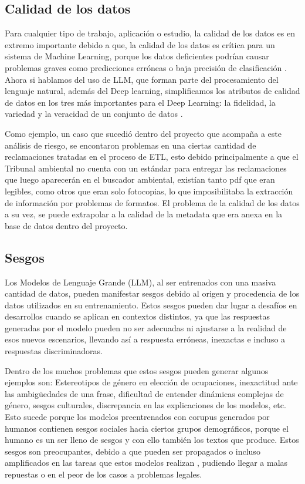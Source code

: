 \newpage

\subsection{Calidad de los datos}

Para cualquier tipo de trabajo, aplicación o estudio, la calidad de los datos es en extremo importante debido a que, la calidad de los datos 
es crítica para un sistema de Machine Learning, porque los datos deficientes podrían causar problemas graves como predicciones erróneas o baja 
precisión de clasificación \cite{calidad1}. Ahora si hablamos del uso de LLM, que forman parte del procesamiento del lenguaje natural, además del Deep learning, 
simplificamos los atributos de calidad de datos en los tres más importantes para el Deep Learning: la fidelidad, la variedad y la veracidad de un conjunto de datos \cite{calidad1}.

Como ejemplo, un caso que sucedió dentro del proyecto que acompaña a este análisis de riesgo, se encontaron problemas en una ciertas cantidad de reclamaciones tratadas en el proceso 
de ETL, esto debido principalmente a que el Tribunal ambiental no cuenta con un estándar para entregar las reclamaciones que luego aparecerán en el buscador ambiental, existían tanto pdf que eran legibles, como otros 
que eran solo fotocopias, lo que imposibilitaba la extracción de información por problemas de formatos. El problema de la calidad de los datos a su vez, se puede extrapolar a la 
calidad de la metadata que era anexa en la base de datos dentro del proyecto.

\subsection{Sesgos} %

Los Modelos de Lenguaje Grande (LLM), al ser entrenados con una masiva cantidad de datos, pueden manifestar sesgos debido al origen y procedencia de los datos utilizados en su entrenamiento. Estos sesgos pueden dar lugar a desafíos en desarrollos cuando se aplican en 
contextos distintos, ya que las respuestas generadas por el modelo pueden no ser adecuadas ni ajustarse a la realidad de 
esos nuevos escenarios, llevando así a respuesta erróneas, inexactas e incluso a respuestas discriminadoras.

Dentro de los muchos problemas que estos sesgos pueden generar algunos ejemplos son: 
Estereotipos de género en elección de ocupaciones, inexactitud ante las ambigüedades de una frase, dificultad de entender dinámicas complejas de género, sesgos culturales, discrepancia en las explicaciones de los modelos, etc. \cite{bias1}
Esto sucede porque los modelos preentrenados con corupus generados por humanos contienen sesgos sociales hacia ciertos grupos demográficos, porque el humano es un ser lleno de sesgos y con ello también los textos que produce. Estos sesgos son preocupantes, debido a que pueden ser propagados o incluso amplificados en las tareas que estos modelos realizan \cite{sesgo2}, pudiendo llegar a malas repuestas o en el peor de los casos a problemas legales.

